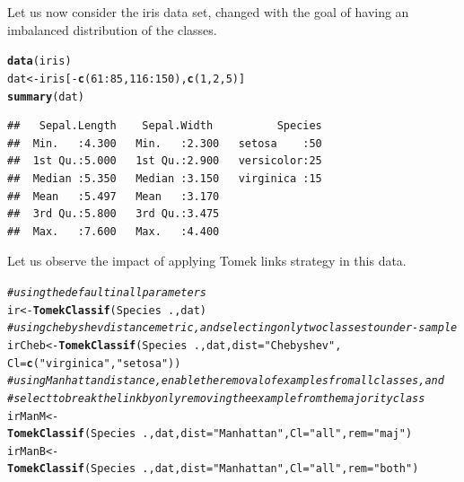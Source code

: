 \documentclass[10pt,a4paper]{article}\usepackage[]{graphicx}\usepackage[]{color}
\makeatletter
\newcommand{\hlnum}[1]{\textcolor[rgb]{0.686,0.059,0.569}{#1}}%
\newcommand{\hlstr}[1]{\textcolor[rgb]{0.192,0.494,0.8}{#1}}%
\newcommand{\hlcom}[1]{\textcolor[rgb]{0.678,0.584,0.686}{\textit{#1}}}%
\newcommand{\hlopt}[1]{\textcolor[rgb]{0,0,0}{#1}}%
\newcommand{\hlstd}[1]{\textcolor[rgb]{0.345,0.345,0.345}{#1}}%
\newcommand{\hlkwb}[1]{\textcolor[rgb]{0.69,0.353,0.396}{#1}}%
\newcommand{\hlkwc}[1]{\textcolor[rgb]{0.333,0.667,0.333}{#1}}%
\newcommand{\hlkwd}[1]{\textcolor[rgb]{0.737,0.353,0.396}{\textbf{#1}}}%
\newenvironment{kframe}{%
 \def\at@end@of@kframe{}%
 \ifinner\ifhmode%
  \def\at@end@of@kframe{\end{minipage}}%
  \begin{minipage}{\columnwidth}%
 \fi\fi%
 \def\FrameCommand##1{\hskip\@totalleftmargin \hskip-\fboxsep
 \colorbox{shadecolor}{##1}\hskip-\fboxsep
     \hskip-\linewidth \hskip-\@totalleftmargin \hskip\columnwidth}%
 \MakeFramed {\advance\hsize-\width
   \@totalleftmargin\z@ \linewidth\hsize
   \@setminipage}}%
 {\par\unskip\endMakeFramed%
 \at@end@of@kframe}
\newenvironment{knitrout}{}{} %
\makeatother
\begin{document}
Let us now consider the iris data set, changed with the goal of having an imbalanced distribution of the classes. 
\begin{knitrout}\footnotesize
{}\color{fgcolor}\begin{kframe}
\begin{alltt}
\hlkwd{data}\hlstd{(iris)}
\hlstd{dat} \hlkwb{<-} \hlstd{iris[}\hlopt{-}\hlkwd{c}\hlstd{(}\hlnum{61}\hlopt{:}\hlnum{85}\hlstd{,} \hlnum{116}\hlopt{:}\hlnum{150}\hlstd{),}\hlkwd{c}\hlstd{(}\hlnum{1}\hlstd{,}\hlnum{2}\hlstd{,}\hlnum{5}\hlstd{)]}
\hlkwd{summary}\hlstd{(dat)}
\end{alltt}
\begin{verbatim}
##   Sepal.Length    Sepal.Width          Species  
##  Min.   :4.300   Min.   :2.300   setosa    :50  
##  1st Qu.:5.000   1st Qu.:2.900   versicolor:25  
##  Median :5.350   Median :3.150   virginica :15  
##  Mean   :5.497   Mean   :3.170                  
##  3rd Qu.:5.800   3rd Qu.:3.475                  
##  Max.   :7.600   Max.   :4.400
\end{verbatim}
\end{kframe}
\end{knitrout}


Let us observe the impact of applying Tomek links strategy in this data.

\begin{knitrout}\footnotesize
{}\color{fgcolor}\begin{kframe}
\begin{alltt}
\hlcom{# using the default in all parameters}
  \hlstd{ir} \hlkwb{<-} \hlkwd{TomekClassif}\hlstd{(Species}\hlopt{~}\hlstd{., dat)}
\hlcom{# using chebyshev distance metric, and selecting only two classes to under-sample}
  \hlstd{irCheb} \hlkwb{<-} \hlkwd{TomekClassif}\hlstd{(Species}\hlopt{~}\hlstd{., dat,} \hlkwc{dist}\hlstd{=}\hlstr{"Chebyshev"}\hlstd{,}
                         \hlkwc{Cl}\hlstd{=}\hlkwd{c}\hlstd{(}\hlstr{"virginica"}\hlstd{,} \hlstr{"setosa"}\hlstd{))}
\hlcom{# using Manhattan distance, enable the removal of examples from all classes, and}
\hlcom{# select to break the link by only removing the example from the majority class}
  \hlstd{irManM} \hlkwb{<-} \hlkwd{TomekClassif}\hlstd{(Species}\hlopt{~}\hlstd{., dat,} \hlkwc{dist}\hlstd{=}\hlstr{"Manhattan"}\hlstd{,} \hlkwc{Cl}\hlstd{=}\hlstr{"all"}\hlstd{,} \hlkwc{rem}\hlstd{=}\hlstr{"maj"}\hlstd{)}
  \hlstd{irManB} \hlkwb{<-} \hlkwd{TomekClassif}\hlstd{(Species}\hlopt{~}\hlstd{., dat,} \hlkwc{dist}\hlstd{=}\hlstr{"Manhattan"}\hlstd{,} \hlkwc{Cl}\hlstd{=}\hlstr{"all"}\hlstd{,} \hlkwc{rem}\hlstd{=}\hlstr{"both"}\hlstd{)}
\end{alltt}
\end{kframe}
\end{knitrout}
\end{document}
